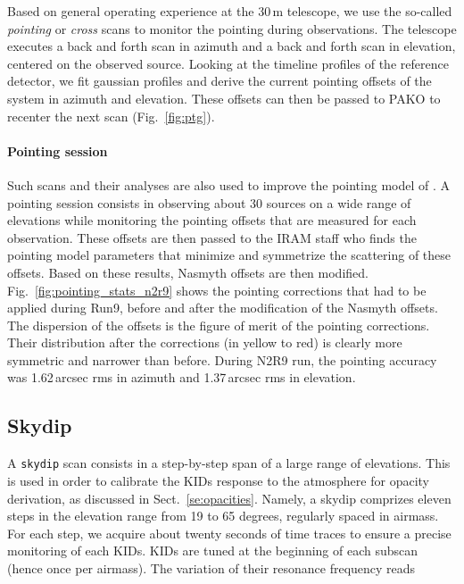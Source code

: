 Based on general operating experience at the 30\,m telescope, we use the so-called
{\em pointing} or {\em cross} scans to monitor the pointing during observations. The
telescope executes a back and forth scan in azimuth and a back and forth scan in
elevation, centered on the observed source. Looking at the timeline profiles of
the reference detector, we fit gaussian profiles and derive the current pointing
offsets of the system in azimuth and elevation. These offsets can then be passed
to PAKO to recenter the next scan (Fig.~\ref{fig:ptg}).

\paragraph{Pointing session}
\label{se:pointing_session}

Such scans and their analyses are also used to improve the pointing model of
\nika. A pointing session consists in observing about 30 sources on a wide range
of elevations  while monitoring the pointing
offsets that are measured for each
observation. These offsets are then passed to the IRAM staff who finds the
pointing model parameters that minimize and symmetrize the scattering of these
offsets. Based on these results, Nasmyth offsets
 are then
modified. Fig.~\ref{fig:pointing_stats_n2r9} shows the pointing corrections that
had to be applied during Run9, before and after the modification of the Nasmyth
offsets. The dispersion of the offsets is the figure of merit of the pointing
corrections. Their distribution after the corrections (in yellow to
red) is clearly more symmetric and narrower than before. During N2R9 run, the
pointing accuracy was 1.62\,arcsec rms in azimuth and 1.37\,arcsec rms in
elevation. 

\subsection{Skydip}
\label{se:skydip}

A {\tt skydip} scan consists in a step-by-step span of a large range
of elevations.  This is used in order to calibrate the KIDs response
to the atmosphere for opacity derivation, as discussed in
Sect.~\ref{se:opacities}.  Namely, a skydip comprizes eleven steps in
the elevation range from 19 to 65 degrees, regularly spaced in
airmass. For each step, we acquire about twenty seconds of time traces
to ensure a precise monitoring of each KIDs. KIDs are tuned at the beginning of
each subscan (hence once per airmass). The variation of their resonance
frequency reads

